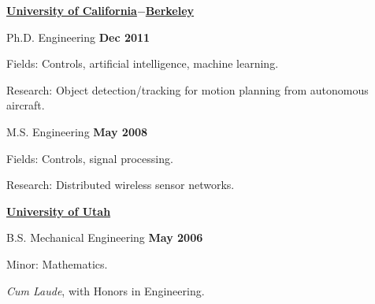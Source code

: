 %
\href{http://www.berkeley.edu/}{\textbf{University of California$-$Berkeley}}
\begin{outerlist}
\item[] Ph.D.
		Engineering \hfill \textbf{Dec 2011}
        \begin{innerlist}
        \item Fields: Controls, artificial intelligence, machine learning.
        \item Research: Object detection/tracking for motion planning from autonomous aircraft.
        \end{innerlist}
\item[] M.S.
        Engineering \hfill \textbf{May 2008}
        \begin{innerlist}
        \item Fields: Controls, signal processing.
        \item Research: Distributed wireless sensor networks.
        \end{innerlist}
\end{outerlist}

\halfblankline

\href{http://www.utah.edu/}{\textbf{University of Utah}}
\begin{outerlist}
\item[] B.S. Mechanical Engineering
		\hfill \textbf{May 2006}
        \begin{innerlist}
        \item Minor: Mathematics.
        \item \emph{Cum Laude}, with Honors in Engineering.
        \end{innerlist}
\end{outerlist}